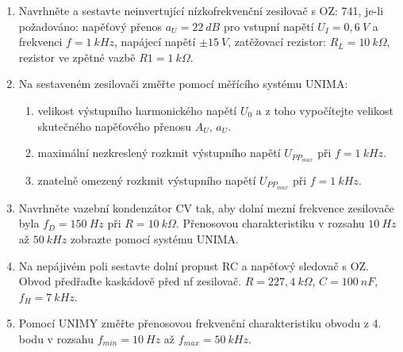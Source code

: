 \begin{minipage}[H][11.48cm][c]{0.8\textwidth}
	\begin{enumerate}
		\item
			Navrhněte a sestavte neinvertující nízkofrekvenční zesilovač s OZ: 741, je-li požadováno: napěťový přenos $a_U = 22~dB$ pro vstupní napětí $U_I = 0,6~V$ a frekvenci $f = 1~kHz$, napájecí napětí $\pm 15~V$, zatěžovací rezistor: $R_L = 10~k\Omega$, rezistor ve zpětné vazbě $R1 = 1~k\Omega$.
		\item
			Na sestaveném zesilovači změřte pomocí měřícího systému UNIMA:
			\begin{enumerate}
				\item        
					velikost výstupního harmonického napětí $U_0$ a z toho vypočítejte velikost skutečného napěťového přenosu $A_U$, $a_U$.
				\item
					maximální nezkreslený rozkmit výstupního napětí $U_{PP_{max}}$ při $f = 1~kHz$.
				\item
					znatelně omezený rozkmit výstupního napětí $U_{PP_{max}}$ při $f = 1~kHz$.
			\end{enumerate}                
		\item
			Navrhněte vazební kondenzátor CV tak, aby dolní mezní frekvence zesilovače byla $f_D = 150~Hz$ při $R = 10~k\Omega$. Přenosovou charakteristiku v rozsahu $10~Hz$ až $50~kHz$ zobrazte pomocí systému UNIMA.
		\item
			Na nepájivém poli sestavte dolní propust RC a napěťový sledovač s OZ. Obvod předřaďte kaskádově před nf zesilovač. $R = 227,4~k\Omega$, $C = 100~nF$, $f_H = 7~kHz$.  
		\item
			Pomocí UNIMY změřte přenosovou frekvenční charakteristiku obvodu z 4. bodu v rozsahu $f_{min} = 10~Hz$ až $f_{max} = 50~kHz$.  
	\end{enumerate}
\end{minipage}


